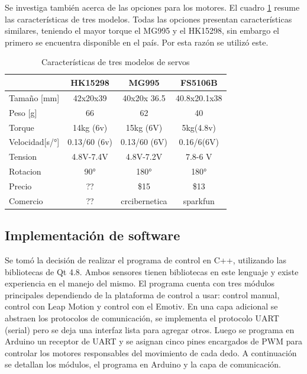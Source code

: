 \documentclass[letterpaper,journal,transmag]{IEEEtran}
\begin{document}
Se investiga también acerca de las opciones para los motores. El cuadro
\ref{tab:servos} resume las características de tres modelos. Todas las opciones
presentan características similares, teniendo el mayor torque el MG995 y el
HK15298, sin embargo el primero se encuentra disponible en el país. Por esta
razón se utilizó este.
   
      \begin{table}[ht]
      \caption{Características de tres modelos de servos}
      \centering
      \begin{tabular}{l c c c}
      \hline
            & HK15298 & MG995 &FS5106B\\
      \hline      
         
   Tamaño [mm] & 42x20x39 & 40x20x 36.5 &40.8x20.1x38 \\
   Peso [g] & 66 &62 & 40\\
   Torque & 14kg (6v) & 15kg (6V) & 5kg(4.8v)\\

   Velocidad[s/°] & 0.13/60 (6v)& 0.13/60 (6V) &0.16/6(6V) \\
   Tension & 4.8V-7.4V & 4.8V-7.2V & 7.8-6 V \\
   Rotacion & 90° &180°&180°\\
   Precio &?? &\$15 &\$13 \\
   Comercio & ?? & crcibernetica & sparkfun\\
         \hline
               \end{tabular}
      \label{tab:servos}
   \end{table}   
   
   
\subsection{Implementación de software}
Se tomó la decisión de realizar el programa de control en C++, utilizando las
bibliotecas de Qt 4.8. Ambos sensores tienen bibliotecas en este lenguaje y
existe experiencia en el manejo del mismo. El programa cuenta con tres módulos
principales dependiendo de la plataforma de control a usar: control manual,
control con Leap Motion y control con el Emotiv. En una capa adicional se
abstraen los protocolos de comunicación, se implementa el protocolo UART
(serial) pero se deja una interfaz lista para agregar otros. Luego se programa
en Arduino un receptor de UART y se asignan cinco pines encargados de PWM para
controlar los motores responsables del movimiento de cada dedo. A continuación
se detallan los módulos, el programa en Arduino y la capa de comunicación.\\
\end{document}
